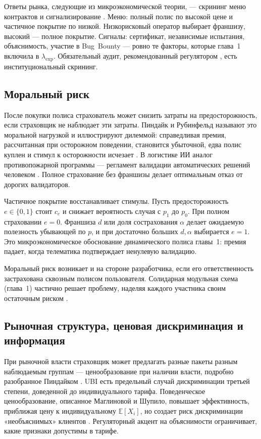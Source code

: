 \documentclass[a4paper,14pt]{extarticle}
\begin{document}
Ответы рынка, следующие из микроэкономической теории, --- скрининг меню контрактов и сигнализирование \cite{pindyck}. Меню: полный полис по высокой цене и частичное покрытие по низкой. Низкорисковый оператор выбирает франшизу, высокий --- полное покрытие. Сигналы: сертификат, независимые испытания, объяснимость, участие в Bug~Bounty --- ровно те факторы, которые глава~1 включила в $\lambda_{\mathrm{exp}}$. Обязательный аудит, рекомендованный регулятором \cite{cbr}, есть институциональный скрининг.

\subsection{Моральный риск}

После покупки полиса страхователь может снизить затраты на предосторожность, если страховщик не наблюдает эти затраты. Пиндайк и Рубинфельд называют это моральной нагрузкой и иллюстрируют дилеммой: справедливая премия, рассчитанная при осторожном поведении, становится убыточной, едва полис куплен и стимул к осторожности исчезает \cite{pindyck}. В логистике ИИ аналог противопожарной программы --- регламент валидации автоматических решений человеком \cite{cbr}. Полное страхование без франшизы делает оптимальным отказ от дорогих валидаторов.

Частичное покрытие восстанавливает стимулы. Пусть предосторожность $e\in\{0,1\}$ стоит $c_e$ и снижает вероятность случая с $p_1$ до $p_0$. При полном страховании $e=0$. Франшиза $d$ или доля сострахования $\alpha$ делает ожидаемую полезность убывающей по $p$, и при достаточно больших $d,\alpha$ выбирается $e=1$. Это микроэкономическое обоснование динамического полиса главы~1: премия падает, когда телематика подтверждает ненулевую валидацию.

Моральный риск возникает и на стороне разработчика, если его ответственность застрахована сквозным полисом пользователя. Солидарная модульная схема (глава~1) частично решает проблему, наделяя каждого участника своим остаточным риском \cite{zezina}.

\subsection{Рыночная структура, ценовая дискриминация и информация}

При рыночной власти страховщик может предлагать разные пакеты разным наблюдаемым группам --- ценообразование при наличии власти, подробно разобранное Пиндайком \cite{pindyck}. UBI есть предельный случай дискриминации третьей степени, доведенной до индивидуального тарифа. Поведенческое ценообразование, описанное Маглиновой и Шупило, повышает эффективность, приближая цену к индивидуальному $\mathbb{E}[X_i]$, но создает риск дискриминации «необъяснимых» клиентов \cite{maglinova}. Регуляторный акцент на объяснимости \cite{cbr} ограничивает, какие признаки допустимы в тарифе.
\end{document}

